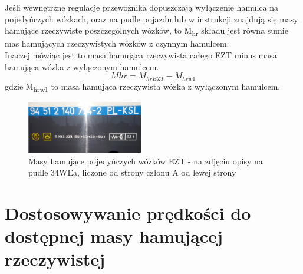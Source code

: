 \begin{tcolorbox}[colback=yellow!15!white,colframe=green!75!black,title=Zmiana M\textsubscript{hr} po wyłączeniu hamulca zespołu trakcyjnego - wariant 2]
	Jeśli wewnętrzne regulacje przewoźnika dopuszczają wyłączenie hamulca na pojedyńczych wózkach, oraz na pudle pojazdu lub w instrukcji znajdują się masy hamujące rzeczywiste poszczególnych wózków, to M\textsubscript{hr} składu jest równa sumie mas hamujących rzeczywistych wózków z czynnym hamulcem.
	\\ Inaczej mówiąc jest to masa hamująca rzeczywista całego EZT minus masa hamująca wózka z wyłączonym hamulcem.
	\[ M{hr} = M_{hrEZT} - M_{hrw1}  \] gdzie M\textsubscript{hrw1} to masa hamująca rzeczywista wózka z wyłączonym hamulcem.
\end{tcolorbox}
\begin{figure}
	\includegraphics[width=0.45\textwidth]{skryptkierownik-img/mhr-wozki.jpg}
	\caption{Masy hamujące pojedyńczych wózków EZT - na zdjęciu opisy na pudle 34WEa, liczone od strony członu A od lewej strony}
\end{figure}

\section{Dostosowywanie prędkości do dostępnej masy hamującej rzeczywistej}

